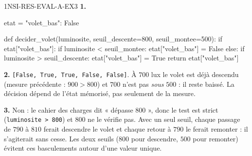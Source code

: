 \begin{corrige}{1NSI-RES-EVAL-A-EX3}
\textbf{1.}
\begin{python}
etat = {"volet_bas": False}

def decider_volet(luminosite, seuil_descente=800, seuil_montee=500):
    if etat["volet_bas"]:
        if luminosite < seuil_montee:
            etat["volet_bas"] = False
    else:
        if luminosite > seuil_descente:
            etat["volet_bas"] = True
    return etat["volet_bas"]
\end{python}

\textbf{2.} \lstinline{[False, True, True, False, False]}. À $700$ lux le volet est déjà
descendu (mesure précédente : $900 > 800$) et $700$ n'est pas \emph{sous} $500$ : il
reste baissé. La décision dépend de l'état mémorisé, pas seulement de la mesure.

\textbf{3.} Non : le cahier des charges dit « dépasse $800$ », donc le test est strict
(\lstinline{luminosite > 800}) et $800$ ne le vérifie pas. Avec un seul seuil, chaque
passage de $790$ à $810$ ferait descendre le volet et chaque retour à $790$ le ferait
remonter : il s'agiterait sans cesse. Les deux seuils ($800$ pour descendre, $500$ pour
remonter) évitent ces basculements autour d'une valeur unique.
\end{corrige}
